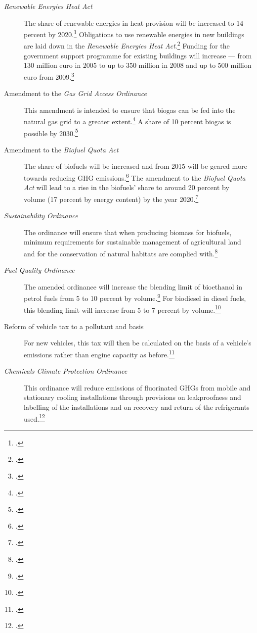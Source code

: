 \documentclass[10pt]{article}
\begin{document}
\begin{description}
	\item[\emph{Renewable Energies Heat Act}] The share of renewable energies in heat provision will be increased to 14 percent by 2020.\footcite[][]{BMUprogramme}
	Obligations to use renewable energies in new buildings are laid down in the \emph{Renewable Energies Heat Act}.\footcite[][]{BMUprogramme}
	Funding for the government support programme for existing buildings will increase --- from 130 million euro in 2005 to up to 350 million in 2008 and up to 500 million euro from 2009.\footcite[][]{BMUprogramme}
	\item[Amendment to the \emph{Gas Grid Access Ordinance}] This amendment is intended to ensure that biogas can be fed into the natural gas grid to a greater extent.\footcite[][]{BMUprogramme}
	A share of 10 percent biogas is possible by 2030.\footcite[][]{BMUprogramme}
	\item[Amendment to the \emph{Biofuel Quota Act}] The share of biofuels will be increased and from 2015 will be geared more towards reducing GHG emissions.\footcite[][]{BMUprogramme}
	The amendment to the \emph{Biofuel Quota Act} will lead to a rise in the biofuels’ share to around 20 percent by volume (17 percent by energy content) by the year 2020.\footcite[][]{BMUprogramme}
	\item[\emph{Sustainability Ordinance}] The ordinance will ensure that when producing biomass for biofuels, minimum requirements for sustainable management of agricultural land and for the conservation of natural habitats are complied with.\footcite[][]{BMUprogramme}
	\item[\emph{Fuel Quality Ordinance}] The amended ordinance will increase the blending limit of bioethanol in petrol fuels from 5 to 10 percent by volume.\footcite[][]{BMUprogramme}
	For biodiesel in diesel fuels, this blending limit will increase from 5 to 7 percent by volume.\footcite[][]{BMUprogramme}
	\item[Reform of vehicle tax to a pollutant and  basis] For new vehicles, this tax will then be calculated on the basis of a vehicle's emissions rather than engine capacity as before.\footcite[][]{BMUprogramme}
	\item[\emph{Chemicals Climate Protection Ordinance}] This ordinance will reduce emissions of fluorinated GHGs from mobile and stationary cooling installations through provisions on leakproofness and labelling of the installations and on recovery and return of the refrigerants used.\footcite[][]{BMUprogramme}
\end{description}
\end{document}
